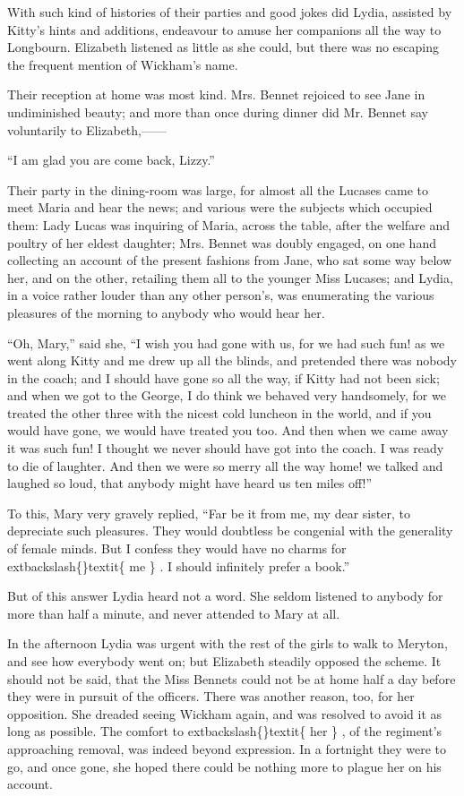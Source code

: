 \documentclass[10pt]{book}
\begin{document}
   With such kind of histories of their parties and good jokes did Lydia,
assisted by Kitty’s hints and additions, endeavour to amuse her
companions all the way to Longbourn. Elizabeth listened as little as she
could, but there was no escaping the frequent mention of Wickham’s name.
  

   Their reception at home was most kind. Mrs. Bennet rejoiced to see Jane
in undiminished beauty; and more than once during dinner did Mr. Bennet
say voluntarily to Elizabeth,——
  

   “I am glad you are come back, Lizzy.”
  

   Their party in the dining-room was large, for almost all the Lucases
came to meet Maria and hear the news; and various were the subjects
which occupied them: Lady Lucas was inquiring of Maria, across the
table, after the welfare and poultry of her eldest daughter; Mrs. Bennet
was doubly engaged, on one hand collecting an account of the present
fashions from Jane, who sat some way below her, and on the other,
retailing them all to the younger Miss Lucases; and Lydia, in a voice
rather louder than any other person’s, was enumerating the various
pleasures of the morning to anybody who would hear her.
  

   “Oh, Mary,” said she, “I wish you had gone with us, for we had such fun!
as we went along Kitty and me drew up all the blinds, and pretended
there was nobody in the coach; and I should have gone so all the way, if
Kitty had not been sick; and when we got to the George, I do think we
behaved very handsomely, for we treated the other three with the nicest
cold luncheon in the world, and if you would have gone, we would have
treated you
   too. And then when we came away it was such fun! I thought
we never should have got into the coach. I was ready to die of laughter.
And then we were so merry all the way home! we talked and laughed so
loud, that anybody might have heard us ten miles off!”
  

   To this, Mary very gravely replied, “Far be it from me, my dear sister,
to depreciate such pleasures. They would doubtless be congenial with the
generality of female minds. But I confess they would have no charms for
   	extbackslash\{\}textit\{
    me
   \}
   . I should infinitely prefer a book.”
  

   But of this answer Lydia heard not a word. She seldom listened to
anybody for more than half a minute, and never attended to Mary at all.
  

   In the afternoon Lydia was urgent with the rest of the girls to walk to
Meryton, and see how everybody went on; but Elizabeth steadily opposed
the scheme. It should not be said, that the Miss Bennets could not be at
home half a day before they were in pursuit of the officers. There was
another reason, too, for her opposition. She dreaded seeing Wickham
again, and was resolved to avoid it as long as possible. The comfort to
   	extbackslash\{\}textit\{
    her
   \}
   , of the regiment’s approaching removal, was indeed beyond
expression. In a fortnight they were to go, and once gone, she hoped
there could be nothing more to plague her on his account.
  
\end{document}
